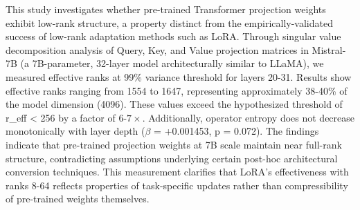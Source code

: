 
This study investigates whether pre-trained Transformer projection weights exhibit low-rank structure, a property distinct from the empirically-validated success of low-rank adaptation methods such as LoRA. Through singular value decomposition analysis of Query, Key, and Value projection matrices in Mistral-7B (a 7B-parameter, 32-layer model architecturally similar to LLaMA), we measured effective ranks at 99\% variance threshold for layers 20-31. Results show effective ranks ranging from 1554 to 1647, representing approximately 38-40\% of the model dimension (4096). These values exceed the hypothesized threshold of r\_eff < 256 by a factor of 6-$7\times$. Additionally, operator entropy does not decrease monotonically with layer depth ($\beta$ = +0.001453, p = 0.072). The findings indicate that pre-trained projection weights at 7B scale maintain near full-rank structure, contradicting assumptions underlying certain post-hoc architectural conversion techniques. This measurement clarifies that LoRA's effectiveness with ranks 8-64 reflects properties of task-specific updates rather than compressibility of pre-trained weights themselves.
